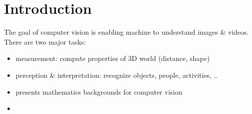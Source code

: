 \chapter{Introduction}
\label{cha:intro}

 The goal of computer vision is enabling machine to understand images \& videos. There are two major tasks:
\begin{itemize}
	\item measurement: compute properties of 3D world (distance, shape)
	\item perception \& interpretation: recognize objects, people, activities, ..
\end{itemize}

\begin{itemize}
	\item {} presents mathematics backgrounds for computer vision
	\item {}
\end{itemize}